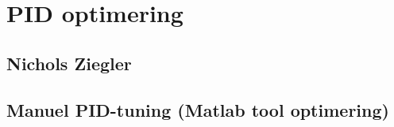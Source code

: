 \section{PID optimering}
\label{sec:PID}
\subsection{Nichols Ziegler}
\subsection{Manuel PID-tuning (Matlab tool optimering)}